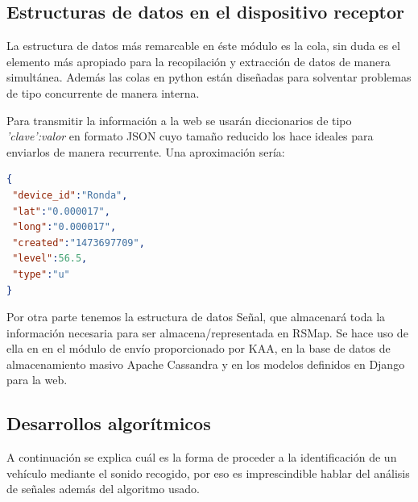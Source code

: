 \subsection{Estructuras de datos en el dispositivo receptor}
La estructura de datos más remarcable en éste módulo es la cola, sin duda es el elemento más apropiado para la recopilación y extracción de datos de manera simultánea. Además las colas en python están diseñadas para solventar problemas de tipo concurrente de manera interna.

\bigskip

Para transmitir la información a la web se usarán diccionarios de tipo \textit{'clave':valor} en formato JSON cuyo tamaño reducido los hace ideales para enviarlos de manera recurrente. Una aproximación sería:

\begin{lstlisting}[language=json,caption={Formato a utilizar},label={lst:json_personal3}]
{
 "device_id":"Ronda",
 "lat":"0.000017",
 "long":"0.000017",
 "created":"1473697709",
 "level":56.5,
 "type":"u"
}
\end{lstlisting}

\bigskip

Por otra parte tenemos la estructura de datos Señal, que almacenará toda la información necesaria para ser almacena/representada en RSMap. Se hace uso de ella en en el módulo de envío proporcionado por KAA, en la base de datos de almacenamiento masivo Apache Cassandra y en los modelos definidos en Django para la web.

\subsection{Desarrollos algorítmicos}

A continuación se explica cuál es la forma de proceder a la identificación de un vehículo mediante el sonido recogido, por eso es imprescindible hablar del análisis de señales además del algoritmo usado.

